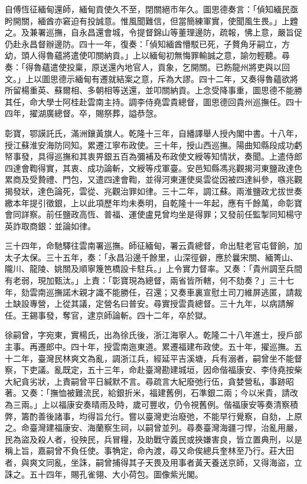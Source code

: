 \begin{pinyinscope}
自傅恆征緬甸還師，緬甸貢使久不至，閉關絕市年久。圖思德奏言：「偵知緬民亟盻開關，緬酋亦窘迫有投誠意。惟風聞難信，但當簡練軍實，使聞風生畏。」上韙之。及兼署巡撫，自永昌還會城，令提督錦山等董理邊防，疏報，怫上意，嚴旨促仍赴永昌督辦邊防。四十一年，復奏：「偵知緬酋懵駁已死，子贅角牙嗣立，方幼，頭人得魯蘊將遣使叩關納貢。」上以緬甸初無悔罪輸誠之意，諭勿輕聽。尋奏：「得魯蘊遣使投稟，原送還內地官人，貢象，乞開關。已飭龍州將吏與以回文。」上以圖思德示緬甸有遷就結案之意，斥為大謬。四十二年，又奏得魯蘊欲將所留楊重英、蘇爾相、多朝相等送還，並叩關納貢。上念受降事重，圖思德不能勝其任，命大學士阿桂赴雲南主持。調李侍堯雲貴總督，圖思德回貴州巡撫任。四十四年，擢湖廣總督。卒，賜祭葬，謚恭愨。

彰寶，鄂謨託氏，滿洲鑲黃旗人。乾隆十三年，自繙譯舉人授內閣中書。十八年，授江蘇淮安海防同知。累遷江寧布政使。三十年，授山西巡撫。陽曲知縣段成功虧帑事發，具得巡撫和其衷畀銀五百為彌補及布政使文綬等知情狀，奏聞。上遣侍郎四達會鞫得實，其衷、成功論斬，文綬等戍軍臺。安邑知縣馮兆觀揭河東鹽政達色累商及受贄禮、門包，又遣四達會鞫，並得河東運使吳雲從因被四達糾參，嗾兆觀揭發狀，達色論死，雲從、兆觀治罪如律。三十二年，調江蘇。兩淮鹽政尤拔世奏繳本年提引徵銀，上以此項歷年均未奏明，自乾隆十一年起，應有千餘萬，命彰寶會同詳察。前任鹽政高恆、普福、運使盧見曾均坐是得罪；又發前任監掣同知楊守英詐取商銀：並論如律。

三十四年，命馳驛往雲南署巡撫。師征緬甸，署云貴總督，命出駐老官屯督餉，加太子太保。三十五年，奏：「永昌沿邊千餘里，山深徑僻，應於曩宋關、緬箐山、隴川、龍陵、姚關及順寧篾笆橋設卡駐兵。」上令實力督率。又奏：「貴州調至兵間有老弱，現加甄汰。」上責：「彰寶現為總督，兩省皆所轄，何不劾奏？」三十七年，劾雲南巡撫諾木親才識不能勝任，召還；又奏車裏宣慰土司刀維屏逃匿，請裁土缺設專營，上從其議，定營名曰普安。尋實授雲貴總督。三十九年，以病請解任。王錫事發，奪官，逮京師論斬。四十二年，卒於獄。

徐嗣曾，字宛東，實楊氏，出為徐氏後，浙江海寧人。乾隆二十八年進士，授戶部主事。再遷郎中。四十年，授雲南迤東道。累遷福建布政使。五十年，擢巡撫。五十二年，臺灣民林爽文為亂，調浙江兵，經延平吉溪塘，兵有溺者，嗣曾坐不能督察，下吏議。亂既定，五十三年，命赴臺灣勘建城垣，因命偕福康安、李侍堯按柴大紀貪劣狀，上責嗣曾平日緘默不言。尋疏言大紀廢弛行伍，貪婪營私，事跡昭著。又奏：「撫恤被難流民，給銀折米，福建舊例，石準銀二兩；今以米貴，請改為三兩。」上以福康安奏晴雨及時，歲可豐收，仍令視舊例。偕福康安等奏清察積弊，籌酌善後諸事，均得旨允行。嘗以臺灣吏治廢弛，不能早行覺察，自劾，上原之。命臺灣建福康安、海蘭察生祠，以嗣曾並列。尋奏臺灣海疆刁悍，治亂用嚴，民為盜及殺人者，役殃民，兵冒糧，及助戰守義民或挾嫌害良，皆立置典刑，以是稱上旨，嘉嗣曾不負任使。事觕定，命內渡，尋又命俟總兵奎林至乃行。莊大田者，與爽文同亂，坐誅，嗣曾捕得其子天畏及用事者黃天養送京師，又得海盜，立誅之。五十四年，賜孔雀翎、大小荷包。圖像紫光閣。


\end{pinyinscope}
